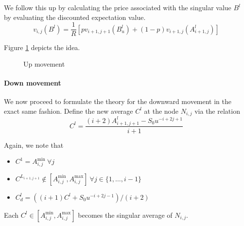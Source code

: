 We follow this up by calculating the price associated with the singular value $ B^l $ by evaluating the discounted expectation value.
\begin{equation}
	\label{eq:asian-up-pr}
	v_{i,j}( B^l ) = \frac{1}{R} \left[ p v_{i+1,j+1} \left( B^l_u \right) + (1 - p) v_{i+1,j} \left( A_{i+1,j}^l \right) \right]
\end{equation}

Figure \ref{fig:asian-2tr-up} depicts the idea.
\begin{figure}[h]
	
	\caption{Up movement}
	\label{fig:asian-2tr-up}
\end{figure}



\paragraph{Down movement}

We now proceed to formulate the theory for the downward movement in the exact same fashion. Define the new average $ C^l $ at the node $ N_{i,j} $ via the relation
\begin{equation}
	\label{eq:asian-proj-dn}
	C^l = \frac{ ( i+2) A_{i+1,j+1}^l - S_0 u^{-i+2j+1} }{ i+1 }
\end{equation}

Again, we note that
\begin{itemize}
\item $ C^1 = A_{i,j}^{\min} \ \forall j $
\item $ C^{L_{i+1,j+1}} \notin \left[ A_{i,j}^{\min}, A_{i,j}^{\max} \right] \ \forall j \in \{1, \dots, i-1 \} $
\item $ C^l_d = \left( (i+1) C^l + S_0 u^{-i+2j-1} \right) / ( i+2 ) $
\end{itemize}
Each $ C^l \in \left[ A_{i,j}^{\min}, A_{i,j}^{\max} \right] $ becomes the singular average of $ N_{i,j} $.

